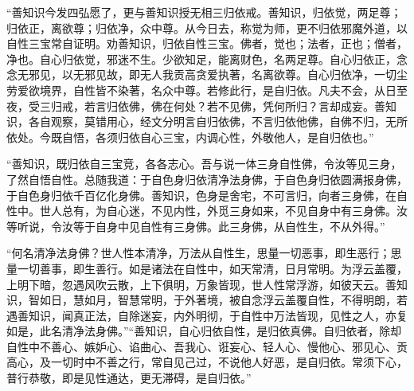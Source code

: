 \documentclass[12pt,twoside,openany]{book}
\begin{document}
“善知识今发四弘愿了，更与善知识授无相三归依戒。善知识，归依觉，两足尊；归依正，离欲尊；归依净，众中尊。从今日去，称觉为师，更不归依邪魔外道，以自性三宝常自证明。劝善知识，归依自性三宝。佛者，觉也；法者，正也；僧者，净也。自心归依觉，邪迷不生。少欲知足，能离财色，名两足尊。自心归依正，念念无邪见，以无邪见故，即无人我贡高贪爱执著，名离欲尊。自心归依净，一切尘劳爱欲境界，自性皆不染著，名众中尊。若修此行，是自归依。凡夫不会，从日至夜，受三归戒，若言归依佛，佛在何处？若不见佛，凭何所归？言却成妄。善知识，各自观察，莫错用心，经文分明言自归依佛，不言归依他佛，自佛不归，无所依处。今既自悟，各须归依自心三宝，内调心性，外敬他人，是自归依也。”

“善知识，既归依自三宝竞，各各志心。吾与说一体三身自性佛，令汝等见三身，了然自悟自性。总随我道：于自色身归依清净法身佛，于自色身归依圆满报身佛，于自色身归依千百亿化身佛。善知识，色身是舍宅，不可言归，向者三身佛，在自性中。世人总有，为自心迷，不见内性，外觅三身如来，不见自身中有三身佛。汝等听说，令汝等于自身中见自性有三身佛。此三身佛，从自性生，不从外得。”

“何名清净法身佛？世人性本清净，万法从自性生，思量一切恶事，即生恶行；思量一切善事，即生善行。如是诸法在自性中，如天常清，日月常明。为浮云盖覆，上明下暗，忽遇风吹云散，上下俱明，万象皆现，世人性常浮游，如彼天云。善知识，智如日，慧如月，智慧常明，于外著境，被自念浮云盖覆自性，不得明朗，若遇善知识，闻真正法，自除迷妄，内外明彻，于自性中万法皆现，见性之人，亦复如是，此名清净法身佛。”“善知识，自心归依自性，是归依真佛。自归依者，除却自性中不善心、嫉妒心、谄曲心、吾我心、诳妄心、轻人心、慢他心、邪见心、贡高心，及一切时中不善之行，常自见己过，不说他人好恶，是自归依。常须下心，普行恭敬，即是见性通达，更无滞碍，是自归依。”
\end{document}
